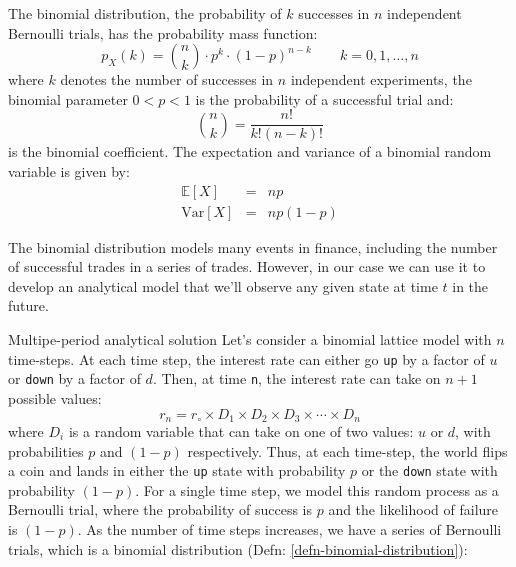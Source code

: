 \documentclass[11pt]{article}
\makeatletter
\theoremstyle{definition}
\renewcommand\subsubsection{\@startsection
	{subsubsection}{2}{0mm}
	{-0.05in}
	{-0.5\baselineskip}
	{\normalfont\normalsize\itshape\bfseries}}
\makeatother
\begin{document}
\begin{definition}\label{def:binomial-distribution}
	The binomial distribution, the probability of $k$ successes in $n$ independent Bernoulli trials, has the 
probability mass function:
\begin{equation*}
p_{X}(k) = \binom{n}{k}\cdot{p^{k}}\cdot\left(1-p\right)^{n-k}\qquad{k=0,1,\dots,n}
\end{equation*}
where $k$ denotes the number of successes in $n$ independent experiments, the binomial parameter $0<p<1$ is the probability 
of a successful trial and:
\begin{equation*}
\binom{n}{k} = \frac{n!}{k!\left(n-k\right)!}
\end{equation*}
is the binomial coefficient. The expectation and variance of a binomial random variable is given by:
\begin{eqnarray*}
\mathbb{E}\left[X\right] &=& np\\
\text{Var}\left[X\right] &=& np(1-p)
\end{eqnarray*}
\end{definition}
The binomial distribution models many events in finance, including the number of successful trades in a series of trades. 
However, in our case we can use it to develop an analytical model that we'll observe any given state at time $t$ in the future.

\subsubsection{Multipe-period analytical solution}
Let's consider a binomial lattice model with $n$ time-steps. At each time step, the interest rate can either go \texttt{up} by a factor of $u$ or \texttt{down} by a factor of $d$.
Then, at time \texttt{n}, the interest rate can take on $n+1$ possible values: 
\begin{equation}
	r_{n} = r_{\circ}\times{D_{1}}\times{D_{2}}\times{D_{3}}\times\cdots\times{D_{n}}
\end{equation}
where $D_{i}$ is a random variable that can take on one of two values: $u$ or $d$, 
with probabilities $p$ and $(1-p)$ respectively. 
Thus, at each time-step, the world flips a coin and lands in either the \texttt{up} state with probability $p$ or the \texttt{down} state with probability $(1-p)$.
For a single time step, we model this random process as a Bernoulli trial, where the probability of success is $p$ and the likelihood of failure is $(1-p)$.
As the number of time steps increases, we have a series of Bernoulli trials, which is a binomial distribution (Defn: \ref{defn-binomial-distribution}):
\end{document}
